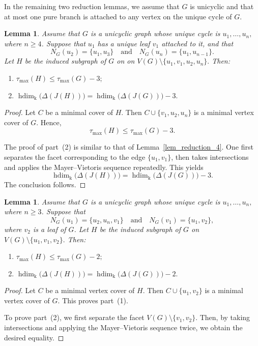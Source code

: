 \documentclass[12pt,amscd]{amsart}
\newtheorem{lem}[thm]{Lemma}
\theoremstyle{definition}
\DeclareMathOperator{\hdim}{hdim}
\def\k {\mathrm k}
\begin{document}
In the remaining two reduction lemmas, we assume that $G$ is unicyclic and that at most one pure branch is attached to any vertex on the unique cycle of $G$.
\begin{lem}\label{lem_reduction_5}
Assume that $G$ is a unicyclic graph whose unique cycle is
\(u_1, \ldots, u_n,\) where $n \ge 4$. Suppose that $u_1$ has a unique leaf $v_1$ attached to it, and that
\[
N_G(u_2) = \{u_1,u_3\}
\quad \text{and} \quad
N_G(u_n) = \{u_1,u_{n-1}\}.
\]
Let $H$ be the induced subgraph of $G$ on
on \(V(G) \setminus \{u_1, v_1, u_2, u_n\}.\) Then:
\begin{enumerate}
    \item     \(     \tau_{\max}(H) \le \tau_{\max}(G) - 3;    \) 
    \item     \(     \hdim_{\k}\bigl(\Delta(J(H))\bigr)
    =
    \hdim_{\k}\bigl(\Delta(J(G))\bigr) - 3.
    \)
\end{enumerate}
\end{lem}
\begin{proof}
Let $C$ be a minimal cover of $H$. Then \( C \cup \{v_1, u_2, u_n\} \) is a minimal vertex cover of $G$. Hence,
\[
\tau_{\max}(H) \le \tau_{\max}(G) - 3.
\]

The proof of part~(2) is similar to that of Lemma~\ref{lem_reduction_4}. One first separates the facet corresponding to the edge $\{u_1, v_1\}$, then takes intersections and applies the Mayer--Vietoris sequence repeatedly. This yields
\[
\hdim_{\k}\bigl(\Delta(J(H))\bigr)
=
\hdim_{\k}\bigl(\Delta(J(G))\bigr) - 3.
\]
The conclusion follows.
\end{proof}

\begin{lem}\label{lem_reduction_6}
Assume that $G$ is a unicyclic graph whose unique cycle is \(u_1, \ldots, u_n,
\) where $n \ge 3$. Suppose that
\[
N_G(u_1) = \{u_2,u_n,v_1\}
\quad \text{and} \quad
N_G(v_1) = \{u_1,v_2\},
\]
where $v_2$ is a leaf of $G$. Let $H$ be the induced subgraph of $G$ on
\(V(G) \setminus \{u_1,v_1,v_2\}.\) Then:
\begin{enumerate}
    \item
    \(
    \tau_{\max}(H) \le \tau_{\max}(G) - 2;
    \)
    \item
    \(
    \hdim_{\k}\bigl(\Delta(J(H))\bigr)
    =
    \hdim_{\k}\bigl(\Delta(J(G))\bigr) - 2.
    \)
\end{enumerate}
\end{lem}
\begin{proof}
Let $C$ be a minimal vertex cover of $H$. Then
\(
C \cup \{u_1,v_2\}
\) is a minimal vertex cover of $G$. This proves part~(1).

To prove part~(2), we first separate the facet
\(V(G) \setminus \{v_1,v_2\}.
\) Then, by taking intersections and applying the Mayer--Vietoris sequence twice, we obtain the desired equality.
\end{proof}
\end{document}
